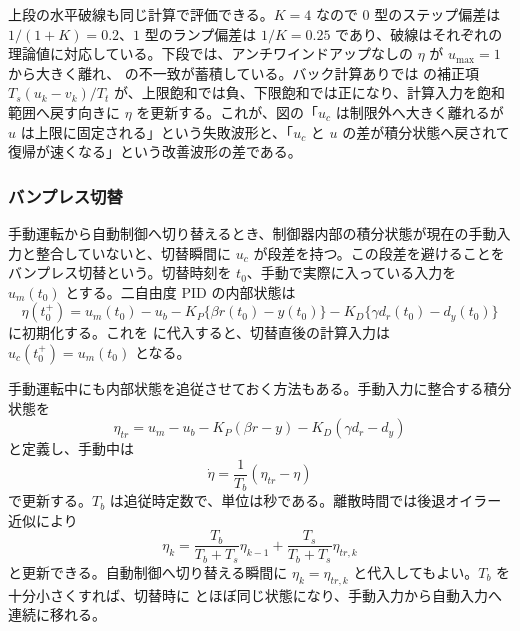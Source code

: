上段の水平破線も同じ計算で評価できる。$K=4$ なので $0$ 型のステップ偏差は $1/(1+K)=0.2$、$1$ 型のランプ偏差は $1/K=0.25$ であり、破線はそれぞれの理論値に対応している。下段では、アンチワインドアップなしの $\eta$ が $u_{\max}=1$ から大きく離れ、 の不一致が蓄積している。バック計算ありでは  の補正項 $T_s(u_k-v_k)/T_t$ が、上限飽和では負、下限飽和では正になり、計算入力を飽和範囲へ戻す向きに $\eta$ を更新する。これが、図の「$u_c$ は制限外へ大きく離れるが $u$ は上限に固定される」という失敗波形と、「$u_c$ と $u$ の差が積分状態へ戻されて復帰が速くなる」という改善波形の差である。

\subsubsection{バンプレス切替}

手動運転から自動制御へ切り替えるとき、制御器内部の積分状態が現在の手動入力と整合していないと、切替瞬間に $u_c$ が段差を持つ。この段差を避けることをバンプレス切替という。切替時刻を $t_0$、手動で実際に入っている入力を $u_m(t_0)$ とする。二自由度 PID の内部状態は
\begin{equation}
  \eta(t_0^+)=u_m(t_0)-u_b
  -K_P\{\beta r(t_0)-y(t_0)\}
  -K_D\{\gamma d_r(t_0)-d_y(t_0)\}
  \label{eq:bumpless-initialization}
\end{equation}
に初期化する。これを  に代入すると、切替直後の計算入力は $u_c(t_0^+)=u_m(t_0)$ となる。

手動運転中にも内部状態を追従させておく方法もある。手動入力に整合する積分状態を
\begin{equation}
  \eta_{tr}=u_m-u_b
  -K_P(\beta r-y)
  -K_D(\gamma d_r-d_y)
\end{equation}
と定義し、手動中は
\begin{equation}
  \dot{\eta}=\frac{1}{T_b}(\eta_{tr}-\eta)
\end{equation}
で更新する。$T_b$ は追従時定数で、単位は秒である。離散時間では後退オイラー近似により
\begin{equation}
  \eta_k=
  \frac{T_b}{T_b+T_s}\eta_{k-1}
  +\frac{T_s}{T_b+T_s}\eta_{tr,k}
\end{equation}
と更新できる。自動制御へ切り替える瞬間に $\eta_k=\eta_{tr,k}$ と代入してもよい。$T_b$ を十分小さくすれば、切替時に  とほぼ同じ状態になり、手動入力から自動入力へ連続に移れる。
